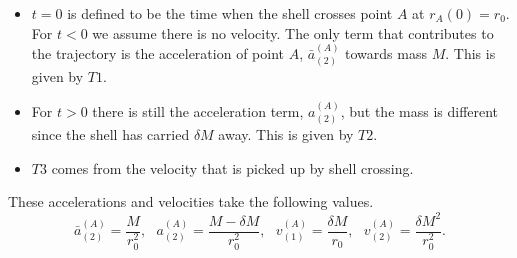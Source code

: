\documentclass[aps,showpacs,onecolumn,floats,prd,superscriptaddress,nofootinbib]{revtex4-1}
\begin{document}
\begin{itemize}
\item $t=0$ is defined to be the time when the shell crosses point $A$ at $r_A(0) = r_0$. For $t<0$ we assume there is no velocity. The only term that contributes to the trajectory is the acceleration of point $A$, $\bar{a}^{(A)}_{(2)}$ towards mass $M$. This is given by $T1$.
\item For $t>0$ there is still the acceleration term, $a^{(A)}_{(2)}$, but the mass is different since the shell has carried $\delta M$ away. This is given by $T2$.
\item $T3$ comes from the velocity that is picked up by shell crossing. 
\end{itemize}

These accelerations and velocities take the following values.
\begin{equation}
	\bar{a}^{(A)}_{(2)} = \frac{M}{r_0^2}, \ \ \ 
	a^{(A)}_{(2)} = \frac{M - \delta M}{r_0^2}, \ \ \ 
	v^{(A)}_{(1)} = \frac{\delta M}{r_0}, \ \ \ 
	v^{(A)}_{(2)} = \frac{\delta M^2}{r_0^2}.
\end{equation} 
\end{document}
